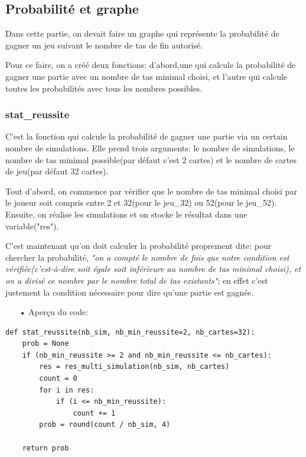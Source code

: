 \subsection{Probabilité et graphe}
\hspace{\parindent} Dans cette partie, on devait faire un graphe qui représente la probabilité de gagner un jeu suivant le nombre de tas de fin autorisé.
\par Pour ce faire, on a créé deux fonctions: d'abord,une qui calcule la probabilité de gagner une partie avec un nombre de tas minimal choisi, et l'autre qui calcule toutes les probabilités avec tous les nombres possibles.
\subsubsection{stat\_reussite}
C'est la fonction qui calcule la probabilité de gagner une partie via un certain nombre de simulations. Elle prend trois arguments: le nombre de simulations, le nombre de tas minimal possible(par défaut c'est 2 cartes) et le nombre de cartes de jeu(par défaut 32 cartes).
\par Tout d'abord, on commence par vérifier que le nombre de tas minimal choisi par le joueur soit compris entre 2 et 32(pour le jeu\_32) ou 52(pour le jeu\_52). Ensuite, on réalise les simulations et on stocke le résultat dans une variable("res"). 
\par C'est maintenant qu'on doit calculer la probabilité proprement dite: pour chercher la probabilité, \emph{"on a compté le nombre de fois que notre condition est vérifiée(c'est-à-dire soit égale soit inférieure au nombre de tas minimal choisi), et on a divisé ce nombre par le nombre total de tas existants"}; en effet c'est justement la condition nécessaire pour dire qu'une partie est gagnée.
	\\
	\begin{itemize}
	\color{blue}\item[•]Aperçu du code:
	\end{itemize}
	
	\lstset{language=Python}
	\lstset{frame=lines}
	\lstset{basicstyle=\footnotesize}
	\begin{lstlisting}
def stat_reussite(nb_sim, nb_min_reussite=2, nb_cartes=32):
    prob = None
    if (nb_min_reussite >= 2 and nb_min_reussite <= nb_cartes):
        res = res_multi_simulation(nb_sim, nb_cartes)
        count = 0
        for i in res:
            if (i <= nb_min_reussite):
                count += 1
        prob = round(count / nb_sim, 4)
        
    return prob
	\end{lstlisting}

